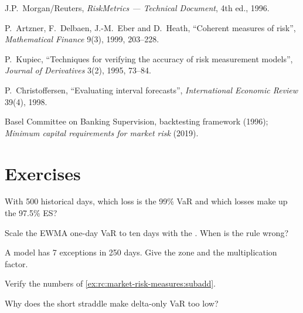 \begin{omsources}
\item J.P.\ Morgan/Reuters, \emph{RiskMetrics --- Technical Document}, 4th ed., 1996.
\item P.\ Artzner, F.\ Delbaen, J.-M.\ Eber and D.\ Heath, ``Coherent measures of risk'',
\emph{Mathematical Finance} 9(3), 1999, 203--228.
\item P.\ Kupiec, ``Techniques for verifying the accuracy of risk measurement models'',
\emph{Journal of Derivatives} 3(2), 1995, 73--84.
\item P.\ Christoffersen, ``Evaluating interval forecasts'', \emph{International Economic Review}
39(4), 1998.
\item Basel Committee on Banking Supervision, backtesting framework (1996); \emph{Minimum capital
requirements for market risk} (2019).
\end{omsources}

\section{Exercises}

\begin{exercise}[$\star$]\label{exo:rc:market-risk-measures:1}
With 500 historical days, which loss is the 99\% VaR and which losses make up the 97.5\% ES?
\end{exercise}

\begin{exercise}[$\star$]\label{exo:rc:market-risk-measures:2}
Scale the EWMA one-day VaR to ten days with the . When is the rule
wrong?
\end{exercise}

\begin{exercise}[$\star$]\label{exo:rc:market-risk-measures:3}
A model has 7 exceptions in 250 days. Give the zone and the multiplication factor.
\end{exercise}

\begin{exercise}[$\star\star$]\label{exo:rc:market-risk-measures:4}
Verify the numbers of \cref{ex:rc:market-risk-measures:subadd}.
\end{exercise}

\begin{exercise}[$\star\star$]\label{exo:rc:market-risk-measures:5}
Why does the short straddle make delta-only VaR too low?
\end{exercise}

